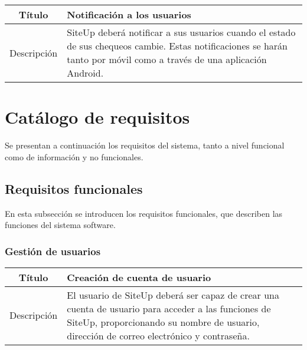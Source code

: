 \begin{center}
  
  \begin{tabularx}{\textwidth}{|c|X|}
    \hline
    Título & Notificación a los usuarios \\

    \hline

    Descripción & SiteUp deberá notificar a sus usuarios cuando el estado de sus
    chequeos cambie. Estas notificaciones se harán tanto por móvil como a través
    de una aplicación Android. \\

    \hline
  \end{tabularx}
\end{center}

\section{Catálogo de requisitos}

Se presentan a continuación los requisitos del sistema, tanto a nivel funcional como de información y no funcionales.

\subsection{Requisitos funcionales}

En esta subsección se introducen los requisitos funcionales, que describen las
funciones del sistema software.

\subsubsection{Gestión de usuarios}

\begin{center}
  
  \begin{tabularx}{\textwidth}{|c|X|}
    \hline
    Título & Creación de cuenta de usuario \\

    \hline

    Descripción & El usuario de SiteUp deberá ser capaz de crear una cuenta de
    usuario para acceder a las funciones de SiteUp, proporcionando su nombre de
    usuario, dirección de correo electrónico y contraseña.\\

    \hline
  \end{tabularx}
\end{center}

